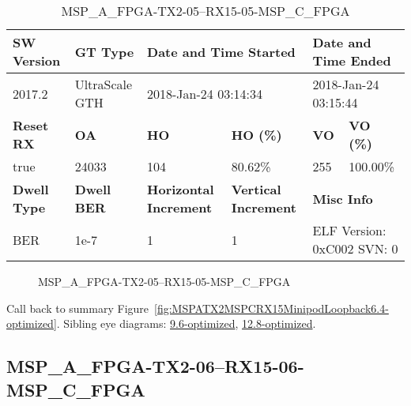 \begin{table}[h]
\centering
\caption{MSP\_A\_FPGA-TX2-05--RX15-05-MSP\_C\_FPGA}
\label{tab:MSPAFPGATX205RX1505MSPCFPGA6.4-optimized}
\begin{tabular}{@{}|l|l|l|l|l|l|@{}}
\toprule
\textbf{SW Version}                & \textbf{GT Type}   & \multicolumn{2}{l|}{\textbf{Date and Time Started}}            & \multicolumn{2}{l|}{\textbf{Date and Time Ended}}        \\ \midrule
2017.2                       & UltraScale GTH          & \multicolumn{2}{l|}{2018-Jan-24 03:14:34}                   & \multicolumn{2}{l|}{2018-Jan-24 03:15:44}               \\ \midrule
\textbf{Reset RX}                  & \textbf{OA} & \textbf{HO}   & \textbf{HO (\%)} & \textbf{VO} & \textbf{VO (\%)} \\ \midrule
true & 24033        & 104          & 80.62\%        & 255        & 100.00\%       \\ \midrule
\textbf{Dwell Type}                & \textbf{Dwell BER} & \textbf{Horizontal Increment} & \textbf{Vertical Increment}    & \multicolumn{2}{l|}{\textbf{Misc Info}}                  \\ \midrule
BER                            & 1e-7        & 1        & 1           & \multicolumn{2}{l|}{ELF Version: 0xC002 SVN: 0}                         \\ \bottomrule
\end{tabular}
\end{table}

\begin{figure}[h]
\caption{MSP\_A\_FPGA-TX2-05--RX15-05-MSP\_C\_FPGA} \label{fig:MSPAFPGATX205RX1505MSPCFPGA6.4-optimized}
\end{figure}

Call back to summary Figure~\ref{fig:MSPATX2MSPCRX15MinipodLoopback6.4-optimized}.
Sibling eye diagrams: \hyperref[sec:MSPAFPGATX205RX1505MSPCFPGA9.6-optimized]{9.6-optimized}, \hyperref[sec:MSPAFPGATX205RX1505MSPCFPGA12.8-optimized]{12.8-optimized}.

\clearpage
\newpage


\subsection{MSP\_A\_FPGA-TX2-06--RX15-06-MSP\_C\_FPGA}\label{sec:MSPAFPGATX206RX1506MSPCFPGA6.4-optimized}

